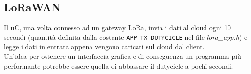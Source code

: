 \subsection{LoRaWAN}\label{ssec:lorawan}
Il uC, una volta connesso ad un gateway LoRa, invia i dati al cloud ogni 10 secondi (quantità definita dalla costante \Verb|APP_TX_DUTYCICLE| nel file \textit{lora\_app.h}) e legge i dati in entrata appena vengono caricati sul cloud dal client.
\\Un'idea per ottenere un interfaccia grafica e di conseguenza un programma più performante potrebbe essere quella di abbassare il dutycicle a pochi secondi.

